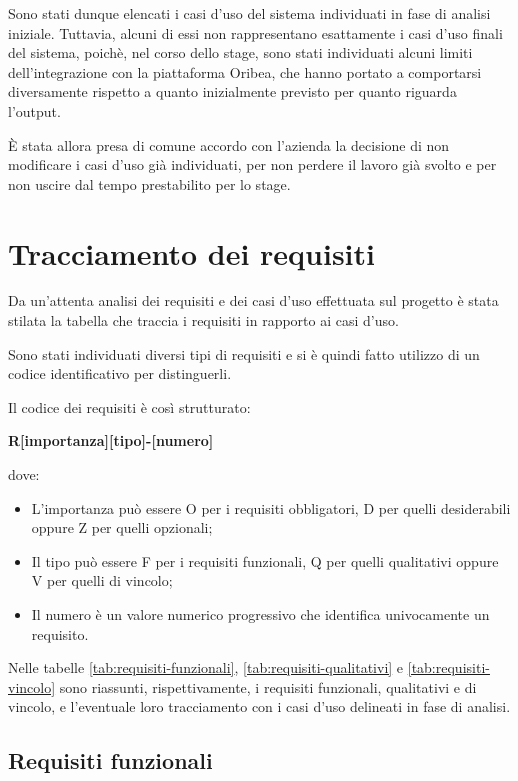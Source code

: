 Sono stati dunque elencati i casi d'uso del sistema individuati in fase di analisi iniziale. Tuttavia, alcuni di essi non rappresentano esattamente i casi d'uso finali del sistema, poichè, nel corso dello stage, sono stati individuati alcuni limiti dell'integrazione con la piattaforma Oribea, che hanno portato a comportarsi diversamente rispetto a quanto inizialmente previsto per quanto riguarda l'output.

È stata allora presa di comune accordo con l'azienda la decisione di non modificare i casi d'uso già individuati, per non perdere il lavoro già svolto e per non uscire dal tempo prestabilito per lo stage.


\newpage









\section{Tracciamento dei requisiti}

Da un'attenta analisi dei requisiti e dei casi d'uso effettuata sul progetto è stata stilata la tabella che traccia i requisiti in rapporto ai casi d'uso.

Sono stati individuati diversi tipi di requisiti e si è quindi fatto utilizzo di un codice identificativo per distinguerli.

Il codice dei requisiti è così strutturato:
\begin{center}
    \textbf{R[importanza][tipo]-[numero]}
\end{center}
dove:
\begin{itemize}
	\item L'importanza può essere O per i requisiti obbligatori, D per quelli desiderabili oppure Z per quelli opzionali;
	\item Il tipo può essere F per i requisiti funzionali, Q per quelli qualitativi oppure V per quelli di vincolo;
	\item Il numero è un valore numerico progressivo che identifica univocamente un requisito.
\end{itemize}
Nelle tabelle \ref{tab:requisiti-funzionali}, \ref{tab:requisiti-qualitativi} e \ref{tab:requisiti-vincolo} sono riassunti, rispettivamente, i requisiti funzionali, qualitativi e di vincolo, e l’eventuale loro tracciamento con i casi d'uso delineati in fase di analisi.


\subsection{Requisiti funzionali}

